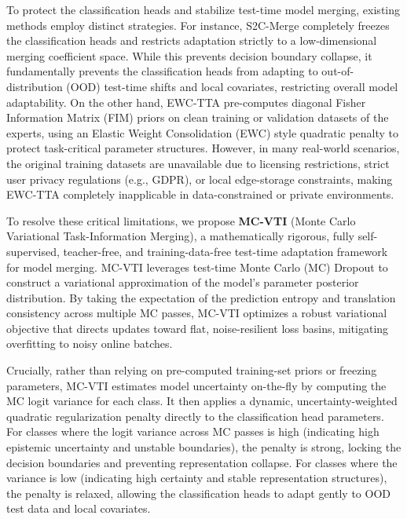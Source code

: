 \documentclass{article}
\theoremstyle{plain}
\theoremstyle{definition}
\theoremstyle{remark}
\begin{document}
To protect the classification heads and stabilize test-time model merging, existing methods employ distinct strategies. For instance, S2C-Merge \cite{s2c2026teacher} completely freezes the classification heads and restricts adaptation strictly to a low-dimensional merging coefficient space. While this prevents decision boundary collapse, it fundamentally prevents the classification heads from adapting to out-of-distribution (OOD) test-time shifts and local covariates, restricting overall model adaptability. On the other hand, EWC-TTA \cite{ewc2026elastic} pre-computes diagonal Fisher Information Matrix (FIM) priors on clean training or validation datasets of the experts, using an Elastic Weight Consolidation (EWC) style quadratic penalty to protect task-critical parameter structures. However, in many real-world scenarios, the original training datasets are unavailable due to licensing restrictions, strict user privacy regulations (e.g., GDPR), or local edge-storage constraints, making EWC-TTA completely inapplicable in data-constrained or private environments.

To resolve these critical limitations, we propose \textbf{MC-VTI} (Monte Carlo Variational Task-Information Merging), a mathematically rigorous, fully self-supervised, teacher-free, and training-data-free test-time adaptation framework for model merging. MC-VTI leverages test-time Monte Carlo (MC) Dropout to construct a variational approximation of the model's parameter posterior distribution. By taking the expectation of the prediction entropy and translation consistency across multiple MC passes, MC-VTI optimizes a robust variational objective that directs updates toward flat, noise-resilient loss basins, mitigating overfitting to noisy online batches. 

Crucially, rather than relying on pre-computed training-set priors or freezing parameters, MC-VTI estimates model uncertainty on-the-fly by computing the MC logit variance for each class. It then applies a dynamic, uncertainty-weighted quadratic regularization penalty directly to the classification head parameters. For classes where the logit variance across MC passes is high (indicating high epistemic uncertainty and unstable boundaries), the penalty is strong, locking the decision boundaries and preventing representation collapse. For classes where the variance is low (indicating high certainty and stable representation structures), the penalty is relaxed, allowing the classification heads to adapt gently to OOD test data and local covariates. 
\end{document}
